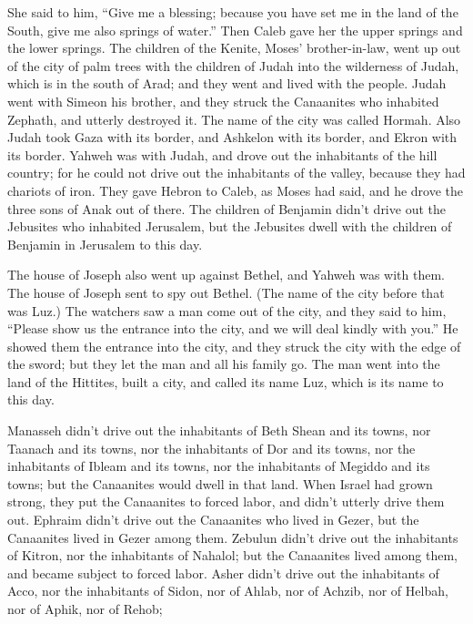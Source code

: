 {\par }{\PP {}She said to him, “Give me a blessing; because you have set me in the land of the South, give me also springs of water.” Then Caleb gave her the upper springs and the lower springs.
The children of the Kenite, Moses’ brother-in-law, went up out of the city of palm trees with the children of Judah into the wilderness of Judah, which is in the south of Arad; and they went and lived with the people.
Judah went with Simeon his brother, and they struck the Canaanites who inhabited Zephath, and utterly destroyed it. The name of the city was called Hormah.
Also Judah took Gaza with its border, and Ashkelon with its border, and Ekron with its border.
Yahweh was with Judah, and drove out the inhabitants of the hill country; for he could not drive out the inhabitants of the valley, because they had chariots of iron.
They gave Hebron to Caleb, as Moses had said, and he drove the three sons of Anak out of there.
The children of Benjamin didn’t drive out the Jebusites who inhabited Jerusalem, but the Jebusites dwell with the children of Benjamin in Jerusalem to this day.
\par }{\PP {}The house of Joseph also went up against Bethel, and Yahweh was with them.
The house of Joseph sent to spy out Bethel. (The name of the city before that was Luz.)
The watchers saw a man come out of the city, and they said to him, “Please show us the entrance into the city, and we will deal kindly with you.”
He showed them the entrance into the city, and they struck the city with the edge of the sword; but they let the man and all his family go.
The man went into the land of the Hittites, built a city, and called its name Luz, which is its name to this day.
\par }{\PP {}Manasseh didn’t drive out the inhabitants of Beth Shean and its towns, nor Taanach and its towns, nor the inhabitants of Dor and its towns, nor the inhabitants of Ibleam and its towns, nor the inhabitants of Megiddo and its towns; but the Canaanites would dwell in that land.
When Israel had grown strong, they put the Canaanites to forced labor, and didn’t utterly drive them out.
Ephraim didn’t drive out the Canaanites who lived in Gezer, but the Canaanites lived in Gezer among them.
Zebulun didn’t drive out the inhabitants of Kitron, nor the inhabitants of Nahalol; but the Canaanites lived among them, and became subject to forced labor.
Asher didn’t drive out the inhabitants of Acco, nor the inhabitants of Sidon, nor of Ahlab, nor of Achzib, nor of Helbah, nor of Aphik, nor of Rehob;
}
